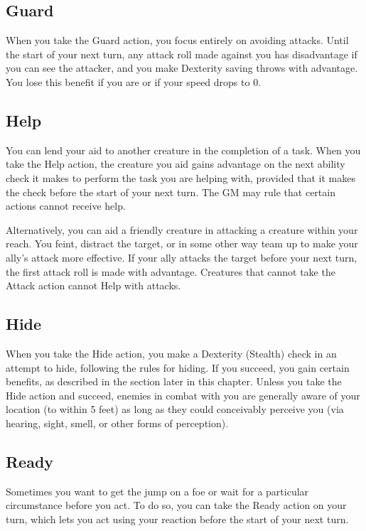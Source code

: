 \subsection{Guard}

When you take the Guard action, you focus entirely on avoiding attacks. Until the start of your next turn, any attack roll made against you has disadvantage if you can see the attacker, and you make Dexterity saving throws with advantage. You lose this benefit if you are  or if your speed drops to 0.

\subsection{Help}

You can lend your aid to another creature in the completion of a task. When you take the Help action, the creature you aid gains advantage on the next ability check it makes to perform the task you are helping with, provided that it makes the check before the start of your next turn. The GM may rule that certain actions cannot receive help.

Alternatively, you can aid a friendly creature in attacking a creature within your reach. You feint, distract the target, or in some other way team up to make your ally's attack more effective. If your ally attacks the target before your next turn, the first attack roll is made with advantage. Creatures that cannot take the Attack action cannot Help with attacks.

\subsection{Hide}

When you take the Hide action, you make a Dexterity (Stealth) check in an attempt to hide, following the rules for hiding. If you succeed, you gain certain benefits, as described in the  section later in this chapter. Unless you take the Hide action and succeed, enemies in combat with you are generally aware of your location (to within 5 feet) as long as they could conceivably perceive you (via hearing, sight, smell, or other forms of perception).

\subsection{Ready}

Sometimes you want to get the jump on a foe or wait for a particular circumstance before you act. To do so, you can take the Ready action on your turn, which lets you act using your reaction before the start of your next turn.

